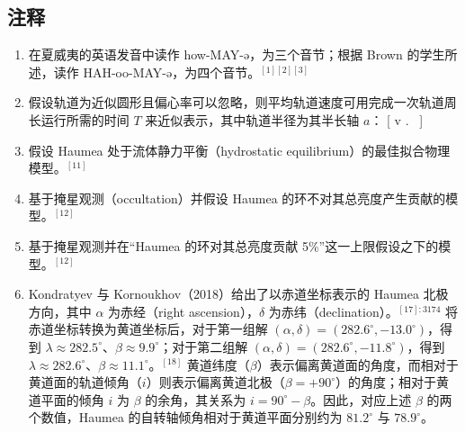 \subsection{注释}
\begin{enumerate}
\item 在夏威夷的英语发音中读作 how-MAY-ə，为三个音节；根据 Brown 的学生所述，读作 HAH-oo-MAY-ə，为四个音节。$^{[1][2][3]}$
\item 假设轨道为近似圆形且偏心率可以忽略，则平均轨道速度可用完成一次轨道周长运行所需的时间 $T$ 来近似表示，其中轨道半径为其半长轴 $a$：
  [
  v \approx {}.~
  ]
\item 假设 Haumea 处于流体静力平衡（hydrostatic equilibrium）的最佳拟合物理模型。$^{[11]}$
\item 基于掩星观测（occultation）并假设 Haumea 的环不对其总亮度产生贡献的模型。$^{[12]}$
\item 基于掩星观测并在“Haumea 的环对其总亮度贡献 5\%”这一上限假设之下的模型。$^{[12]}$
\item Kondratyev 与 Kornoukhov（2018）给出了以赤道坐标表示的 Haumea 北极方向，其中 $\alpha$ 为赤经（right ascension），$\delta$ 为赤纬（declination）。$^{[17]:3174}$
将赤道坐标转换为黄道坐标后，对于第一组解 $(\alpha, \delta) = (282.6^\circ, -13.0^\circ)$，得到 $\lambda \approx 282.5^\circ$、$\beta \approx 9.9^\circ$；对于第二组解 $(\alpha, \delta) = (282.6^\circ, -11.8^\circ)$，得到 $\lambda \approx 282.6^\circ$、$\beta \approx 11.1^\circ$。$^{[18]}$
黄道纬度（$\beta$）表示偏离黄道面的角度，而相对于黄道面的轨道倾角（$i$）则表示偏离黄道北极（$\beta = +90^\circ$）的角度；相对于黄道平面的倾角 $i$ 为 $\beta$ 的余角，其关系为 $i = 90^\circ - \beta$。因此，对应上述 $\beta$ 的两个数值，Haumea 的自转轴倾角相对于黄道平面分别约为 $81.2^\circ$ 与 $78.9^\circ$。
\end{enumerate}
